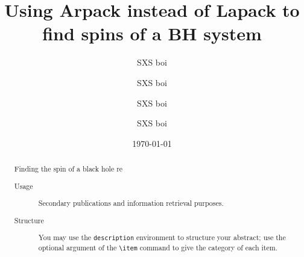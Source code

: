 \documentclass[%
 reprint,
 amsmath,amssymb,
 aps,
]{revtex4-2}
\begin{document}

\title{Using Arpack instead of Lapack to find spins of a BH system \cite{lovelace_binary-black-hole_2008}}%

\author{SXS boi}
\author{SXS boi}%
%


\author{SXS boi}
%
%
\author{SXS boi}
%


\date{\today}%

\begin{abstract}

  Finding the spin of a black hole re

\begin{description}
\item[Usage]
Secondary publications and information retrieval purposes.
\item[Structure]
You may use the \texttt{description} environment to structure your abstract;
use the optional argument of the \verb+\item+ command to give the category of each item. 
\end{description}
\end{abstract}

\maketitle
\end{document}
